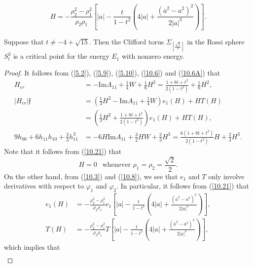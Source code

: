 \documentclass[10pt,a4paper]{amsart}
\begin{document}
\begin{equation}\label{10.21}
H=-\frac{\rho_2^2-\rho_1^2}{\rho_2\rho_1}\left[|a|-\frac{t}{1-t^2}\left(4|a|+\frac{(\overline{a}^2-a^2)^2}{2|a|^3}\right)\right].
\end{equation}

\begin{lem}\label{lem5.2}
Suppose that $t\neq -4+\sqrt{15}$. 
Then the Clifford torus
 $\Sigma_{[\frac{\sqrt{2}}{2}]}$ 
in the Rossi sphere $S^3_{t}$
is a critical point for the energy $E_1$ with nonzero energy.
\end{lem}

\begin{proof}
It follows from  (\ref{5.2}), (\ref{5.9}),
(\ref{5.10}), (\ref{10.6}) and (\ref{10.6A})
that 
\begin{equation}\label{10.28}
\begin{split}
H_{cr}&=-\mbox{Im} A_{11}+\frac{1}{4}W+\frac{1}{6}H^2=\frac{1+8t+t^2}{2(1-t^2)}+\frac{1}{6}H^2,\\
|H_{cr}|\mathfrak{f}&=\left(\frac{1}{3}H^2-\mbox{Im} A_{11}+\frac{1}{4}W\right)e_1(H)+HT(H)\\
&=\left(\frac{1}{3}H^2+\frac{1+8t+t^2}{2(1-t^2)}\right)e_1(H)+HT(H),\\
9h_{00}+6h_{11}h_{10}+\frac{2}{3}h_{11}^3&=-6H\mbox{Im} A_{11}+\frac{3}{2}HW+\frac{2}{3}H^3
=\frac{6(1+8t+t^2)}{2(1-t^2)}H+\frac{2}{3}H^3.
\end{split}
\end{equation}
Note that it follows from (\ref{10.21}) that 
\begin{equation}\label{10.31}
H=0~~\mbox{ whenever }\rho_1=\rho_2=\frac{\sqrt{2}}{2}.
\end{equation}
On the other hand, from (\ref{10.3}) and (\ref{10.8}), 
we see that $e_1$ and $T$ only involve derivatives
with respect to $\varphi_1$ and $\varphi_2$. 
In particular, it follows from (\ref{10.21}) that 
\begin{equation*}
\begin{split}
e_1(H)&=-\frac{\rho_2^2-\rho_1^2}{\rho_2\rho_1}e_1\left[|a|-\frac{t}{1-t^2}\left(4|a|+\frac{(\overline{a}^2-a^2)^2}{2|a|^3}\right)\right],\\
T(H)&=-\frac{\rho_2^2-\rho_1^2}{\rho_2\rho_1}T\left[|a|-\frac{t}{1-t^2}\left(4|a|+\frac{(\overline{a}^2-a^2)^2}{2|a|^3}\right)\right],
\end{split}
\end{equation*}
which implies that 
\begin{equation}\label{10.30}
\begin{split}

\end{split}
\end{equation}
\end{proof}
\end{document}
